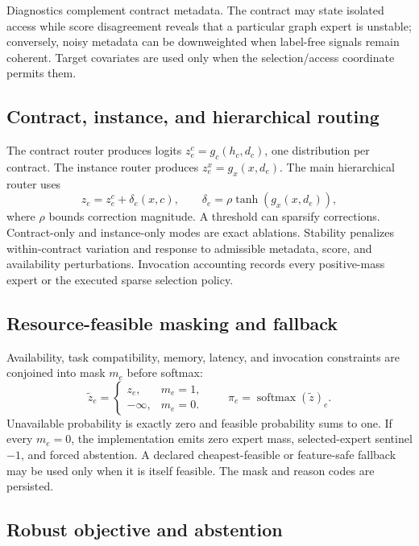 Diagnostics complement contract metadata. The contract may state isolated access while score disagreement reveals that a particular graph expert is unstable; conversely, noisy metadata can be downweighted when label-free signals remain coherent. Target covariates are used only when the selection/access coordinate permits them.

\subsection{Contract, instance, and hierarchical routing}

The contract router produces logits \(z^c_e=g_c(h_c,d_c)\), one distribution per contract. The instance router produces \(z^x_e=g_x(x,d_e)\). The main hierarchical router uses
\[
z_e=z^c_e+\delta_e(x,c),\qquad
\delta_e=\rho\tanh(g_x(x,d_e)),
\]
where \(\rho\) bounds correction magnitude. A threshold can sparsify corrections. Contract-only and instance-only modes are exact ablations. Stability penalizes within-contract variation and response to admissible metadata, score, and availability perturbations. Invocation accounting records every positive-mass expert or the executed sparse selection policy.

\subsection{Resource-feasible masking and fallback}

Availability, task compatibility, memory, latency, and invocation constraints are conjoined into mask \(m_e\) before softmax:
\[
\tilde z_e=\begin{cases}z_e,&m_e=1,\\-\infty,&m_e=0.\end{cases}
\qquad
\pi_e=\operatorname{softmax}(\tilde z)_e.
\]
Unavailable probability is exactly zero and feasible probability sums to one. If every \(m_e=0\), the implementation emits zero expert mass, selected-expert sentinel \(-1\), and forced abstention. A declared cheapest-feasible or feature-safe fallback may be used only when it is itself feasible. The mask and reason codes are persisted.

\subsection{Robust objective and abstention}

